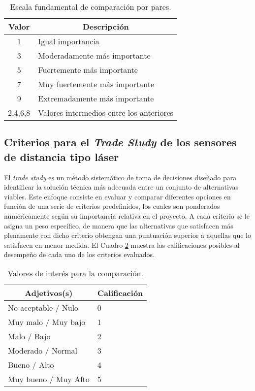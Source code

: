\begin{table}[H]
	\centering
	\begin{tabular}{|c|l|}
		\hline
		\multicolumn{1}{|c|}{\textbf{Valor}}&\multicolumn{1}{|c|}{\textbf{Descripción}}\\ \hline
		1&Igual importancia\\ \hline
		3&Moderadamente más importante\\ \hline
		5&Fuertemente más importante\\ \hline
		7&Muy fuertemente más importante\\ \hline
		9&Extremadamente más importante\\ \hline
		2,4,6,8&Valores intermedios entre los anteriores\\ \hline
		
	\end{tabular}
	\caption{Escala fundamental de comparación por pares.} 
	\label{cuadro:valoresPP}
\end{table}

\subsection{Criterios para el \textit{Trade Study} de los sensores de distancia tipo láser}
El \textit{trade study} es un método sistemático de toma de decisiones diseñado para identificar la solución técnica más adecuada entre un conjunto de alternativas viables. Este enfoque consiste en evaluar y comparar diferentes opciones en función de una serie de criterios predefinidos, los cuales son ponderados numéricamente según su importancia relativa en el proyecto. A cada criterio se le asigna un peso específico, de manera que las alternativas que satisfacen más plenamente con dicho criterio obtengan una puntuación superior a aquellas que lo satisfacen en menor medida. El Cuadro \ref{cuadro:valoresCompa} muestra las calificaciones posibles al desempeño de cada uno de los criterios evaluados.

\begin{table}[H]
	\centering
	\begin{tabular}{|l|l|}
		\hline
		\multicolumn{1}{|c|}{\textbf{Adjetivos(s)}}&\multicolumn{1}{|c|}{\textbf{Calificación}}\\ \hline
		No aceptable / Nulo&0\\ \hline
		Muy malo / Muy bajo&1\\ \hline
		Malo / Bajo&2\\ \hline
		Moderado / Normal&3\\ \hline
		Bueno / Alto&4\\ \hline
		Muy bueno / Muy Alto&5\\ \hline
		
	\end{tabular}
	\caption{Valores de interés para la comparación.} 
	\label{cuadro:valoresCompa}
\end{table}

